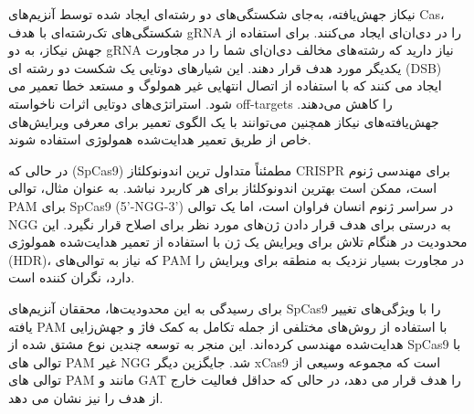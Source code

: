 \documentclass[12pt,a4paper,BCOR=.7cm,headsepline,bibliography=totoc]{report}
\begin{document}
نیکاز  جهش‌یافته‌، به‌جای شکستگی‌های دو رشته‌ای ایجاد شده توسط آنزیم‌های Cas، شکستگی‌های تک‌رشته‌ای با هدف gRNA را در دی‌ان‌ای ایجاد می‌کنند. برای استفاده از جهش نیکاز، به دو gRNA نیاز دارید که رشته‌های مخالف دی‌ان‌ای شما را در مجاورت یکدیگر مورد هدف قرار دهند. این شیارهای دوتایی یک شکست دو رشته ای (DSB) ایجاد می کنند که با استفاده از اتصال انتهایی غیر همولوگ  و مستعد خطا تعمیر می شود. استراتژی‌های دوتایی اثرات ناخواسته off-targets را کاهش می‌دهند. جهش‌یافته‌های نیکاز همچنین می‌توانند با یک الگوی تعمیر برای معرفی ویرایش‌های خاص از طریق تعمیر هدایت‌شده همولوژی  استفاده شوند.

در حالی که  (SpCas9) مطمئناً متداول ترین اندونوکلئاز CRISPR برای مهندسی ژنوم است، ممکن است بهترین اندونوکلئاز برای هر کاربرد نباشد. به عنوان مثال، توالی PAM برای SpCas9 (5'-NGG-3') در سراسر ژنوم انسان فراوان است، اما یک توالی NGG به درستی برای هدف قرار دادن ژن‌های مورد نظر برای اصلاح قرار نگیرد. این محدودیت در هنگام تلاش برای ویرایش یک ژن با استفاده از تعمیر هدایت‌شده همولوژی (HDR)، که نیاز به توالی‌های PAM در مجاورت بسیار نزدیک به منطقه برای ویرایش را دارد، نگران کننده است.

برای رسیدگی به این محدودیت‌ها، محققان آنزیم‌های SpCas9 را با ویژگی‌های تغییر یافته PAM با استفاده از روش‌های مختلفی از جمله تکامل به کمک فاژ و جهش‌زایی هدایت‌شده مهندسی کرده‌اند. این منجر به توسعه چندین نوع مشتق شده از SpCas9 با توالی های PAM غیر NGG شد. جایگزین دیگر   xCas9 است که مجموعه وسیعی از توالی های PAM مانند  و GAT را هدف قرار می دهد، در حالی که حداقل فعالیت خارج از هدف را نیز نشان می دهد.
\end{document}

